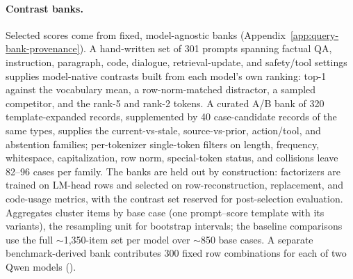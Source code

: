 \paragraph{Contrast banks.}
Selected scores come from fixed, model-agnostic banks
(Appendix~\ref{app:query-bank-provenance}). A hand-written set of 301
prompts spanning factual QA, instruction, paragraph, code, dialogue,
retrieval-update, and safety/tool settings supplies model-native contrasts
built from each model's own ranking: top-1 against the vocabulary mean, a
row-norm-matched distractor, a sampled competitor, and the rank-5 and
rank-2 tokens. A curated A/B bank of 320 template-expanded records,
supplemented by 40 case-candidate records of the same types,
supplies the current-vs-stale, source-vs-prior, action/tool, and
abstention families; per-tokenizer single-token filters on
length, frequency, whitespace, capitalization, row norm, special-token
status, and collisions
leave 82--96 cases per family. The banks are held out by construction:
factorizers are trained on LM-head rows and selected on
row-reconstruction, replacement, and code-usage metrics, with the
contrast set reserved for post-selection evaluation.
Aggregates cluster items by base case (one prompt--score template with
its variants), the resampling unit for bootstrap intervals; the baseline
comparisons use the full \(\sim\)1{,}350-item set per model over
\(\sim\)850 base cases. A separate benchmark-derived bank contributes 300
fixed row combinations for each of two Qwen models
().
